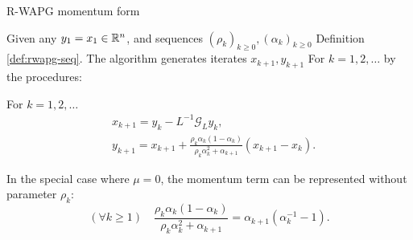 \documentclass[11pt]{beamer}
\theoremstyle{definition}
\begin{document}
        \begin{frame}{R-WAPG momentum form}
            \begin{definition}\label{def:r-wapg-momentum-form}
                Given any $y_1 = x_1 \in \mathbb R^n$, and sequences $(\rho_k)_{k \ge 0}, (\alpha_k)_{k\ge 0}$ Definition \ref{def:rwapg-seq}. 
                The algorithm generates iterates $x_{k + 1}, y_{k + 1}$ For $k = 1, 2, \ldots $ by the procedures: 
                {\small
                \begin{tcolorbox}
                    For $k=1, 2,\ldots $
                    \begin{align*}
                        & x_{k + 1} = y_k - L^{-1}\mathcal G_Ly_k, 
                        \\
                        & 
                        y_{k + 1} = 
                        x_{k + 1} + 
                        \frac{\rho_k\alpha_k(1 - \alpha_k)}{\rho_k\alpha_k^2 + \alpha_{k + 1}}(x_{k + 1} - x_k). 
                    \end{align*}    
                \end{tcolorbox}
                }
                In the special case where $\mu = 0$, the momentum term can be represented without parameter $\rho_k$: 
                $$
                    (\forall k \ge 1)\quad \frac{\rho_k\alpha_k(1 - \alpha_k)}{\rho_k\alpha_k^2 + \alpha_{k + 1}} 
                    = \alpha_{k + 1}(\alpha_k^{-1} - 1). 
                $$
            \end{definition}
        \end{frame}
\end{document}
